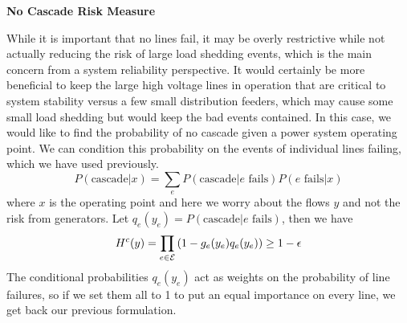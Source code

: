 \textbf{No Cascade Risk Measure}

While it is important that no lines fail, it may be overly restrictive while not actually reducing the risk of large load shedding events, which is the main concern from a system reliability perspective. It would certainly be more beneficial to keep the large high voltage lines in operation that are critical to system stability versus a few small distribution feeders, which may cause some small load shedding but would keep the bad events contained.  In this case, we would like to find the probability of no cascade given a power system operating point.  We can condition this probability on the events of individual lines failing, which we have used previously.
\begin{equation*}
P(\mbox{cascade}|x) = \sum_e P(\mbox{cascade}|e\mbox{ fails}) P(e\mbox{ fails}|x)
\end{equation*}
where $x$ is the operating point and here we worry about the flows $y$ and not the risk from generators.  Let $q_e(y_e) = P(\mbox{cascade}|e\mbox{ fails})$, then we have
\begin{equation} 
H^c(y) = \prod_{e \in \mathcal{E}} \left( 1 - g_e(y_e)q_e(y_e) \right) \geq 1 - \epsilon
  \end{equation}  
The conditional probabilities $q_e(y_e)$ act as weights on the probability of line failures, so if we set them all to 1 to put an equal importance on every line, we get back our previous formulation.
